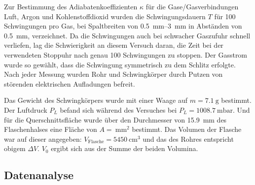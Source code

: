 		Zur Bestimmung des Adiabatenkoeffizienten $\kappa$ für die Gase/Gasverbindungen Luft, Argon und Kohlenstoffdioxid wurden die Schwingungsdauern $T$ für 100 Schwingungen pro Gas, bei Spaltbreiten von \SIrange{0,5}{3}{\milli\meter} in Abständen von \SI{0,5}{\milli\meter}, verzeichnet. %
		Da die Schwingungen auch bei schwacher Gaszufuhr schnell verliefen, lag die Schwierigkeit an diesem Versuch daran, die Zeit bei der verwendeten Stoppuhr nach genau 100 Schwingungen zu stoppen.
		Der Gasstrom wurde so gewählt, dass die Schwingung symmetrisch zu dem Schlitz erfolgte.
		Nach jeder Messung wurden Rohr und Schwingkörper durch Putzen von störenden elektrischen Aufladungen befreit.
		
		Das Gewicht des Schwingkörpers wurde mit einer Waage auf $m = \SI{7,1}{\gram}$ bestimmt. %
		Der Luftdruck $P_L$ befand sich während des Versuches bei $P_L = \SI{1008,7}{\milli\bar}$. %
		Und für die Querschnittsfläche wurde über den Durchmesser von \SI{15,9}{\milli\meter} des Flaschenhalses eine Fläche von $A = \SI{}{\milli\meter^2}$ bestimmt. %
		Das Volumen der Flasche war auf dieser angegeben: $V_\text{Flasche} = \SI{5450}{\centi\meter^3}$ und das des Rohres entspricht obigem $\Delta V$.
		$V_0$ ergibt sich aus der Summe der beiden Volumina.
		
	\subsection{Datenanalyse}
	
